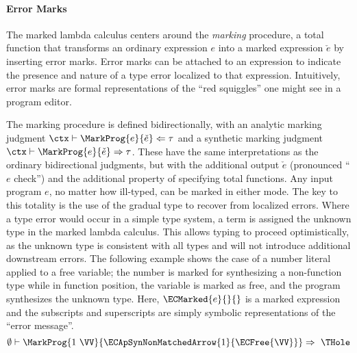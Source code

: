 
\paragraph{Error Marks} The marked lambda calculus centers around the \textit{marking} procedure, a total function that transforms an ordinary expression $e$ into a marked expression $\check{e}$ by inserting error marks. Error marks can be attached to an expression to indicate the presence and nature of a type error localized to that expression. Intuitively, error marks are formal representations of the ``red squiggles'' one might see in a program editor.

The marking procedure is defined bidirectionally, with an analytic marking judgment $\ctx\vdash \MarkProg{e}{\check{e}}\Leftarrow\tau$ and a synthetic marking judgment $\ctx\vdash \MarkProg{e}{\check{e}}\Rightarrow\tau$. These have the same interpretations as the ordinary bidirectional judgments, but with the additional output $\check{e}$ (pronounced ``$e$ check'') and the additional property of specifying total functions. Any input program $e$, no matter how ill-typed, can be marked in either mode. The key to this totality is the use of the gradual type to recover from localized errors. Where a type error would occur in a simple type system, a term is assigned the unknown type in the marked lambda calculus. This allows typing to proceed optimistically, as the unknown type is consistent with all types and will not introduce additional downstream errors. The following example shows the case of a number literal applied to a free variable; the number is marked for synthesizing a non-function type while in function position, the variable is marked as free, and the program synthesizes the unknown type. Here, $\ECMarked{e}{}{}$ is a marked expression and the subscripts and superscripts are simply symbolic representations of the ``error message''.
\[
\centering
\emptyset\vdash \MarkProg{1~\VV}{\ECApSynNonMatchedArrow{1}{\ECFree{\VV}}}\Rightarrow~\THole
\]

